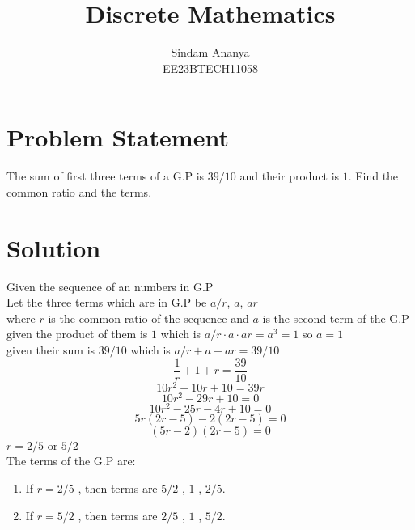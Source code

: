 \documentclass{article}
\begin{document}
\title{Discrete Mathematics}
\author{Sindam Ananya \\
        EE23BTECH11058}
\maketitle

\section*{Problem Statement}
The sum of first three terms of a G.P is $39/10$ and their product is $1$. Find the common ratio and the terms.

\section*{Solution}

Given the sequence of an numbers in G.P\\
Let the three terms which are in G.P be $a/r$, $a$, $ar$\\
where $r$ is the common ratio of the sequence and $a$ is the second term of the G.P\\
given the product of them is $1$ which is $a/r \cdot a \cdot ar = a^3 = 1$ so $a=1$\\
given their sum is $39/10$ which is $a/r + a + ar = 39/10$\\
\[
\frac{1}{r} + 1 + r = \frac{39}{10}
\]
\[
10r^2 + 10r + 10 = 39r
\]
\[
10r^2 - 29r + 10 = 0
\]
\[
10r^2 - 25r - 4r + 10 = 0
\]
\[
5r(2r - 5) - 2(2r - 5) = 0
\]
\[
(5r - 2)(2r - 5) = 0
\]
$r = 2/5$ or $5/2$\\
The terms of the G.P are: 
\begin{enumerate}
      \item If $r = 2/5$ , then terms are $5/2$ , $1$ , $2/5$.
      \item If $r = 5/2$ , then terms are $2/5$ , $1$ , $5/2$.
\end{enumerate}
\end{document}
